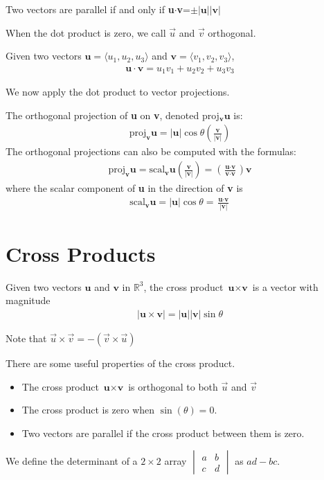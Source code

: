 \documentclass[../calc3.tex]{subfiles}
\begin{document}
Two vectors are parallel if and only if \textbf{u}$\cdot$\textbf{v}=$\pm|\textbf{u}||\textbf{v}|$ 

When the dot product is zero, we call $\vec{u}$ and $\vec{v}$ orthogonal.
\begin{theorem}
    Given two vectors $\textbf{u}=\langle u_1, u_2, u_3 \rangle$ and $\textbf{v}=\langle v_1, v_2, v_3 \rangle$,
    \begin{align*} 
    \textbf{u}\cdot\textbf{v}=u_1v_1+u_2v_2+u_3v_3
    \end{align*}
\end{theorem}
We now apply the dot product to vector projections.
\begin{definition}
    The orthogonal projection of \textbf{u} on \textbf{v}, denoted proj$_{\textbf{v}}\textbf{u}$ is:
    \begin{align*}
        \text{proj}_{\textbf{v}}\textbf{u}=|\textbf{u}|\cos\theta\left(\frac{\textbf{v}}{|\textbf{v}|}\right)
    \end{align*}
    The orthogonal projections can also be computed with the formulas:
    \begin{align*}
    \text{proj}_{\textbf{v}}\textbf{u}=\text{scal}_{\textbf{v}}\textbf{u}\left(\frac{\textbf{v}}{|\textbf{v}|}\right)=\left(\frac{\textbf{u}\cdot\textbf{v}}{\textbf{v}\cdot\textbf{v}}\right)\textbf{v}
    \end{align*}
    where the scalar component of \textbf{u} in the direction of \textbf{v} is 
    \begin{align*}
    \text{scal}_{\textbf{v}}\textbf{u}=|\textbf{u}|\cos\theta = \frac{\textbf{u}\cdot\textbf{v}}{|\textbf{v}|}
    \end{align*}
\end{definition}

\section{Cross Products}
\begin{definition}
    Given two vectors $\textbf{u}$ and $\textbf{v}$ in $\mathbb{R}^3$, the cross product $\textbf{u}\times\textbf{v}$ is a vector with magnitude
    \begin{align*}
        |\textbf{u}\times\textbf{v}|=|\textbf{u}||\textbf{v}|\sin\theta
    \end{align*}
\end{definition}
Note that $\vec{u}\times\vec{v}=-(\vec{v}\times\vec{u})$

There are some useful properties of the cross product.
\begin{itemize}
    \item The cross product $\textbf{u}\times\textbf{v}$ is orthogonal to both $\vec{u}$ and $\vec{v}$
    \item The cross product is zero when $\sin(\theta)=0$.
    \item Two vectors are parallel if the cross product between them is zero.
\end{itemize}
We define the determinant of a $2\times 2$ array
$\begin{vmatrix}
a & b\\
c & d   
\end{vmatrix}$
as $ad-bc$.
\end{document}
